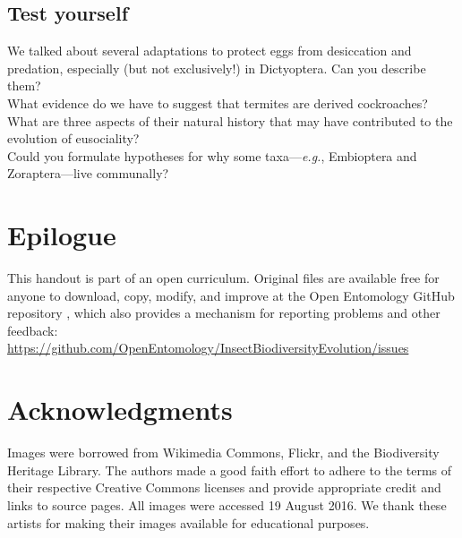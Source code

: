 \documentclass[letterpaper, 11pt]{article}
\begin{document}
\subsection*{Test yourself}
We talked about several adaptations to protect eggs from desiccation and predation, especially (but not exclusively!) in Dictyoptera. Can you describe them? \\

\noindent{}What evidence do we have to suggest that termites are derived cockroaches? What are three aspects of their natural history that may have contributed to the evolution of eusociality?\\

\noindent{}Could you formulate hypotheses for why some taxa---\textit{e.g.}, Embioptera and Zoraptera---live communally?


\FloatBarrier
\section*{Epilogue}
This handout is part of an open curriculum. Original files are available free for anyone to download, copy, modify, and improve at the Open Entomology GitHub repository \citep{ENT432}, which also provides a mechanism for reporting problems and other feedback:\\
\url{https://github.com/OpenEntomology/InsectBiodiversityEvolution/issues}

\section*{Acknowledgments}
Images were borrowed from Wikimedia Commons, Flickr, and the Biodiversity Heritage Library. The authors made a good faith effort to adhere to the terms of their respective Creative Commons licenses and provide appropriate credit and links to source pages. All images were accessed 19 August 2016. We thank these artists for making their images available for educational purposes.

\FloatBarrier


\end{document}
